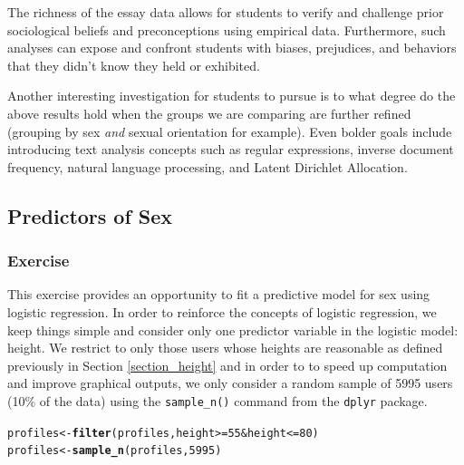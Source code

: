 \documentclass{article}\usepackage[]{graphicx}\usepackage[]{color}
\makeatletter
\newcommand{\hlnum}[1]{\textcolor[rgb]{0.686,0.059,0.569}{#1}}%
\newcommand{\hlopt}[1]{\textcolor[rgb]{0,0,0}{#1}}%
\newcommand{\hlstd}[1]{\textcolor[rgb]{0.345,0.345,0.345}{#1}}%
\newcommand{\hlkwb}[1]{\textcolor[rgb]{0.69,0.353,0.396}{#1}}%
\newcommand{\hlkwd}[1]{\textcolor[rgb]{0.737,0.353,0.396}{\textbf{#1}}}%
\newenvironment{kframe}{%
 \def\at@end@of@kframe{}%
 \ifinner\ifhmode%
  \def\at@end@of@kframe{\end{minipage}}%
  \begin{minipage}{\columnwidth}%
 \fi\fi%
 \def\FrameCommand##1{\hskip\@totalleftmargin \hskip-\fboxsep
 \colorbox{shadecolor}{##1}\hskip-\fboxsep
     \hskip-\linewidth \hskip-\@totalleftmargin \hskip\columnwidth}%
 \MakeFramed {\advance\hsize-\width
   \@totalleftmargin\z@ \linewidth\hsize
   \@setminipage}}%
 {\par\unskip\endMakeFramed%
 \at@end@of@kframe}
\newenvironment{knitrout}{}{} %
\makeatother
\begin{document}
The richness of the essay data allows for students to verify and challenge prior sociological beliefs and preconceptions using empirical data.  Furthermore, such analyses can expose and confront students with biases, prejudices, and behaviors that they didn't know they held or exhibited.

Another interesting investigation for students to pursue is to what degree do the above results hold when the groups we are comparing are further refined (grouping by sex \textit{and} sexual orientation for example).  Even bolder goals include introducing text analysis concepts such as regular expressions, inverse document frequency, natural language processing, and Latent Dirichlet Allocation\cite{LDA:2003}.







\subsection{Predictors of Sex}
\subsubsection{Exercise}
This exercise provides an opportunity to fit a predictive model for sex using logistic regression.  In order to reinforce the concepts of logistic regression, we keep things simple and consider only one predictor variable in the logistic model: height.  We restrict to only those users whose heights are reasonable as defined previously in Section \ref{section_height} and in order to to speed up computation and improve graphical outputs, we only consider a random sample of 5995 users (10\% of the data) using the \verb#sample_n()# command from the \verb#dplyr# package.

\begin{knitrout}
\color{fgcolor}\begin{kframe}
\begin{alltt}
\hlstd{profiles} \hlkwb{<-} \hlkwd{filter}\hlstd{(profiles, height}\hlopt{>=}\hlnum{55} \hlopt{&} \hlstd{height} \hlopt{<=}\hlnum{80}\hlstd{)}
\hlstd{profiles} \hlkwb{<-} \hlkwd{sample_n}\hlstd{(profiles,} \hlnum{5995}\hlstd{)}
\end{alltt}
\end{kframe}
\end{knitrout}
\end{document}
